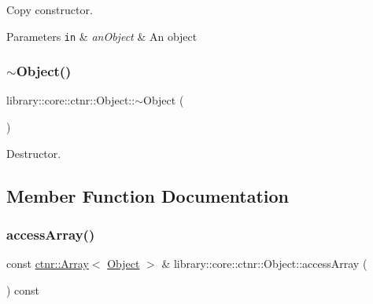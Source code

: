 Copy constructor. 


\begin{DoxyParams}[1]{Parameters}
\mbox{\tt in}  & {\em an\+Object} & An object \\
\hline
\end{DoxyParams}
\mbox{\label{classlibrary_1_1core_1_1ctnr_1_1_object_a18a5350937267e55df0a76f5ce154a7a}} 
\subsubsection{\texorpdfstring{$\sim$\+Object()}{~Object()}}
{\footnotesize\ttfamily library\+::core\+::ctnr\+::\+Object\+::$\sim$\+Object (\begin{DoxyParamCaption}{ }\end{DoxyParamCaption})}



Destructor. 



\subsection{Member Function Documentation}
\mbox{\label{classlibrary_1_1core_1_1ctnr_1_1_object_a6578940b2f6f7099c89e9696c31a9076}} 
\subsubsection{\texorpdfstring{access\+Array()}{accessArray()}\hspace{0.1cm}{\footnotesize\ttfamily [1/2]}}
{\footnotesize\ttfamily const \hyperlink{classlibrary_1_1core_1_1ctnr_1_1_array}{ctnr\+::\+Array}$<$ \hyperlink{classlibrary_1_1core_1_1ctnr_1_1_object}{Object} $>$ \& library\+::core\+::ctnr\+::\+Object\+::access\+Array (\begin{DoxyParamCaption}{ }\end{DoxyParamCaption}) const}

